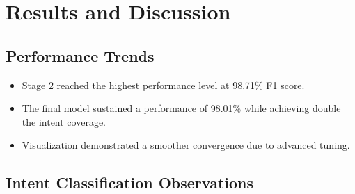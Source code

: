 \documentclass{ecai}
\begin{document}
\section{Results and Discussion}

\subsection{Performance Trends}
\begin{itemize}
    \item Stage 2 reached the highest performance level at 98.71\% F1 score.
    \item The final model sustained a performance of 98.01\% while achieving double the intent coverage.
    \item Visualization demonstrated a smoother convergence due to advanced tuning.
\end{itemize}

\subsection{Intent Classification Observations}
\end{document}
